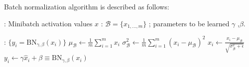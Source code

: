 Batch normalization algorithm is described as follows:

\vspace*{1.3\baselineskip}
\begin{algorithmic}[1]

\REQUIRE : Minibatch activation values $x$ : $\mathcal B = \{x_{1,\ldots,m}\}$ ; parameters to be learned $\gamma$ ,$\beta$.

\ENSURE  : $\{y_i = \mathrm{BN}_{\gamma,\beta}(x_i)\}$
\vspace*{.7\baselineskip}
\STATE $\mu_{\mathcal B} \leftarrow \frac1m \sum_{i = 1}^m x_i$
\vspace*{.7\baselineskip}
\STATE $\sigma^2_{\mathcal B} \leftarrow \frac1m \sum_{i=1}^m (x_i - \mu_{\mathcal B})^2$
\vspace*{.7\baselineskip}
\STATE $\hat x_i \leftarrow \frac{x_i - \mu_{\mathcal B}}{\sqrt{\sigma_{\mathcal B}^2 + \epsilon}}$
\vspace*{.7\baselineskip}
\STATE $y_i \leftarrow \gamma \hat x_i + \beta \equiv \mathrm{BN}_{\gamma,\beta}(x_i)$

\end{algorithmic}